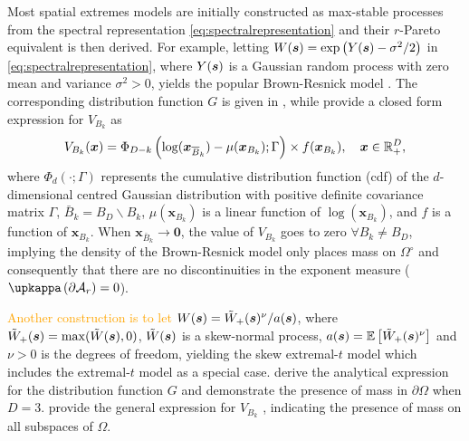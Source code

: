 \documentclass[12pt]{article}
\newcommand{\PZ}{\textcolor{orange}}
\begin{document}

Most spatial extremes models are initially constructed as max-stable processes from the spectral representation \eqref{eq:spectralrepresentation} and their $r$-Pareto equivalent is then derived.
%
For example, letting $W({\boldsymbol{s}})=\exp \left(Y({\boldsymbol{s}}) - \sigma^2/2\right)$ in \eqref{eq:spectralrepresentation}, where $Y({\boldsymbol{s}})$ is a Gaussian random process with zero mean and variance $\sigma^2>0$, yields the popular Brown-Resnick model \citep{Brown.Resnick:1977, Kabluchko.etal:2009}. The corresponding distribution function $G$ is given in \citet{Huser.Davison:2013a}, while \cite{Wadsworth.Tawn:2014} provide a closed form expression for $V_{B_k}$ as
%
$$
V_{B_k}({\boldsymbol{x}}) = \Phi_{D-k}\left(\log({\boldsymbol{x}}_{{\overline{B}}_k}) - \mu({\boldsymbol{x}}_{B_k});\Gamma \right) \times f({\boldsymbol{x}}_{B_k}), \quad {\boldsymbol{x}} \in {\mathbb R}_+^D,
$$
%
where $\Phi_d(\cdot; \Gamma)$ represents the cumulative distribution function (cdf) of the $d$-dimensional centred Gaussian distribution with positive definite covariance matrix $\Gamma$, $\bar{B}_k = B_D \backslash B_k$, $\mu(\bm x_{B_k})$ is a linear function of $\log(\bm x_{B_k})$, 
and $f$ is a function of $\bm x_{B_k}$. When $\bm x_{\bar{B}_k}\to \bm 0$, the value of $V_{B_k}$ goes to zero $\forall B_k\neq B_D$, implying the density of the Brown-Resnick model only places mass on $\Omega^\circ$ 
and consequently that there are no discontinuities in the exponent measure ($\upkappa\left( \partial \calA_r\right)=0$).

\PZ{Another construction is to let $W({\boldsymbol{s}})= \tilde{W}_+({\boldsymbol{s}})^\nu / a({\boldsymbol{s}})$}, where $\tilde{W}_+({\boldsymbol{s}}) = \max(\tilde W({\boldsymbol{s}}),0)$, $\tilde W({\boldsymbol{s}})$ is a skew-normal process, $a({\boldsymbol{s}}) = \mathbb{E} \left[ \tilde{W}_+({\boldsymbol{s}})^\nu \right]$ and $\nu>0$ is the degrees of freedom, yielding the skew extremal-$t$ model \citep{Beranger.etal:2017} which includes the extremal-$t$ model \citep{Opitz:2013} as a special case. \citet{Beranger.etal:2017} derive the analytical expression for the distribution function $G$ and demonstrate the presence of mass in $\partial\Omega$ when $D=3$.
\cite{Beranger.etal:2021} provide the general expression for $V_{B_k}$ \citep[see][for results specific to the extremal-$t$]{Thibaud.Opitz:2015}, indicating the presence of mass on all subspaces of 
$\Omega$.
\end{document}
